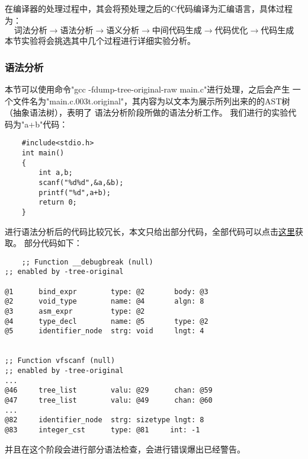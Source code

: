 \documentclass[UTF8]{ctexart}
\begin{document}
在编译器的处理过程中，其会将预处理之后的C代码编译为汇编语言，具体过程为：
$$
\mbox{词法分析}\rightarrow \mbox{语法分析}\rightarrow \mbox{语义分析} \rightarrow \mbox{中间代码生成} \rightarrow \mbox{代码优化} \rightarrow \mbox{代码生成}
$$
本节实验将会挑选其中几个过程进行详细实验分析。
\subsubsection{语法分析}
本节可以使用命令"gcc -fdump-tree-original-raw main.c"进行处理，之后会产生
一个文件名为"main.c.003t.original"，其内容为以文本为展示所列出来的的AST树（抽象语法树），表明了
语法分析阶段所做的语法分析工作。
我们进行的实验代码为"a+b"代码：
\begin{lstlisting}
    #include<stdio.h>
    int main()
    {
        int a,b;
        scanf("%d%d",&a,&b);
        printf("%d",a+b);
        return 0;
    }    
\end{lstlisting}
进行语法分析后的代码比较冗长，本文只给出部分代码，全部代码可以点击\href{https://paste.ubuntu.com/p/XCnsWDX527/}{这里}获取。
部分代码如下：
\begin{lstlisting}
    ;; Function __debugbreak (null)
;; enabled by -tree-original

@1      bind_expr        type: @2       body: @3      
@2      void_type        name: @4       algn: 8       
@3      asm_expr         type: @2      
@4      type_decl        name: @5       type: @2      
@5      identifier_node  strg: void     lngt: 4       


;; Function vfscanf (null)
;; enabled by -tree-original
...
@46     tree_list        valu: @29      chan: @59     
@47     tree_list        valu: @49      chan: @60     
...
@82     identifier_node  strg: sizetype lngt: 8       
@83     integer_cst      type: @81     int: -1

\end{lstlisting}
并且在这个阶段会进行部分语法检查，会进行错误爆出已经警告。
\end{document}
